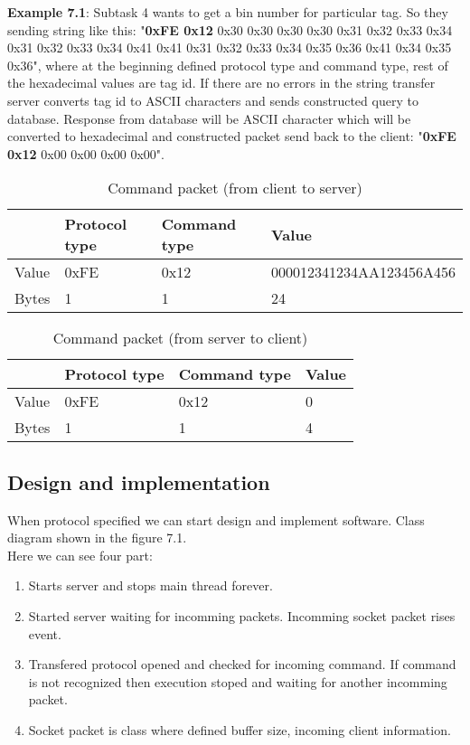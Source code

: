 \textbf{Example 7.1}: Subtask 4 wants to get a bin number for particular tag. So they sending string like this: 
"\textbf{0xFE 0x12} 0x30 0x30 0x30 0x30 0x31 0x32 0x33 0x34 0x31 0x32 0x33 0x34 0x41 0x41 0x31 0x32 0x33 0x34 0x35 0x36 0x41 0x34 0x35 0x36", where at the beginning defined protocol type and command type, rest of the hexadecimal values are tag id. If there are no errors in the string transfer server converts tag id to ASCII characters and sends constructed query to database. Response from database will be ASCII character which will be converted to hexadecimal and constructed packet send back to the client: "\textbf{0xFE 0x12} 0x00 0x00 0x00 0x00".

\begin{table}[h]
	\centering
    \begin{tabular}{ | p{1cm} | p{3cm} | p{3cm} | p{5cm} |}
    \hline
	& \textbf{Protocol type} & \textbf{Command type} & \textbf{Value}  \\ \hline
	Value & 0xFE & 0x12 & 000012341234AA123456A456 \\ \hline
	Bytes & 1 & 1 & 24  \\ \hline
    \end{tabular}
	\caption{Command packet (from client to server)}
	\label{tab:FromClient}
\end{table}

\begin{table}[h]
	\centering
    \begin{tabular}{ | p{1cm} | p{3cm} | p{3cm} | p{5cm} |}
    \hline
	& \textbf{Protocol type} & \textbf{Command type} & \textbf{Value}  \\ \hline
	Value & 0xFE & 0x12 & 0 \\ \hline
	Bytes & 1 & 1 & 4  \\ \hline
    \end{tabular}
	\caption{Command packet (from server to client)}
	\label{tab:FromServer}
\end{table}

\subsection{Design and implementation}

When protocol specified we can start design and implement software. Class diagram shown in the figure 7.1. \\ Here we can see four part:

\begin{enumerate}
	\item Starts server and stops main thread forever.
	\item Started server waiting for incomming packets. Incomming socket packet rises event.
	\item Transfered protocol opened and checked for incoming command. If command is not recognized then execution stoped and waiting for another incomming packet.
	\item Socket packet is class where defined buffer size, incoming client information.
\end{enumerate}

